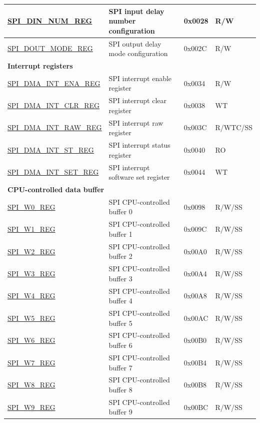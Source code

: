 \begin{longtable}{ | p{6cm} | p{7.2cm} | p{1.3cm} | p{1cm} | }
\hyperref[regdesc:SPIDINNUMREG]{SPI\_DIN\_NUM\_REG} & SPI input delay number configuration & 0x0028 & R/W \\ \hline
\hyperref[regdesc:SPIDOUTMODEREG]{SPI\_DOUT\_MODE\_REG} & SPI output delay mode configuration & 0x002C & R/W \\ \hline
\multicolumn{4}{|l|}{\textbf{Interrupt registers}} \\ \hline
\hyperref[regdesc:SPIDMAINTENAREG]{SPI\_DMA\_INT\_ENA\_REG} & SPI interrupt enable register & 0x0034 & R/W \\ \hline
\hyperref[regdesc:SPIDMAINTCLRREG]{SPI\_DMA\_INT\_CLR\_REG} & SPI interrupt clear register & 0x0038 & WT \\ \hline
\hyperref[regdesc:SPIDMAINTRAWREG]{SPI\_DMA\_INT\_RAW\_REG} & SPI interrupt raw register & 0x003C & R/WTC/SS \\ \hline
\hyperref[regdesc:SPIDMAINTSTREG]{SPI\_DMA\_INT\_ST\_REG} & SPI interrupt status register & 0x0040 & RO \\ \hline
\hyperref[regdesc:SPIDMAINTSETREG]{SPI\_DMA\_INT\_SET\_REG} & SPI interrupt software set register & 0x0044 & WT \\ \hline
\multicolumn{4}{|l|}{\textbf{CPU-controlled data buffer}} \\ \hline
\hyperref[regdesc:SPIW0REG]{SPI\_W0\_REG} & SPI CPU-controlled buffer 0 & 0x0098 & R/W/SS \\ \hline
\hyperref[regdesc:SPIW1REG]{SPI\_W1\_REG} & SPI CPU-controlled buffer 1 & 0x009C & R/W/SS \\ \hline
\hyperref[regdesc:SPIW2REG]{SPI\_W2\_REG} & SPI CPU-controlled buffer 2 & 0x00A0 & R/W/SS \\ \hline
\hyperref[regdesc:SPIW3REG]{SPI\_W3\_REG} & SPI CPU-controlled buffer 3 & 0x00A4 & R/W/SS \\ \hline
\hyperref[regdesc:SPIW4REG]{SPI\_W4\_REG} & SPI CPU-controlled buffer 4 & 0x00A8 & R/W/SS \\ \hline
\hyperref[regdesc:SPIW5REG]{SPI\_W5\_REG} & SPI CPU-controlled buffer 5 & 0x00AC & R/W/SS \\ \hline
\hyperref[regdesc:SPIW6REG]{SPI\_W6\_REG} & SPI CPU-controlled buffer 6 & 0x00B0 & R/W/SS \\ \hline
\hyperref[regdesc:SPIW7REG]{SPI\_W7\_REG} & SPI CPU-controlled buffer 7 & 0x00B4 & R/W/SS \\ \hline
\hyperref[regdesc:SPIW8REG]{SPI\_W8\_REG} & SPI CPU-controlled buffer 8 & 0x00B8 & R/W/SS \\ \hline
\hyperref[regdesc:SPIW9REG]{SPI\_W9\_REG} & SPI CPU-controlled buffer 9 & 0x00BC & R/W/SS \\ \hline

\end{longtable}
